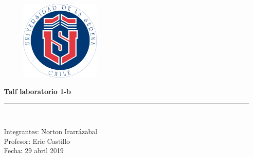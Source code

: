 \documentclass[a4paper,openright,14pt]{report}
\begin{document}
\begin{titlepage}

\begin{center}
\vspace*{-1in}
\begin{figure}[htb]
\begin{center}
\includegraphics[width=4cm]{logo}
\end{center}
\end{figure}

\begin{large}

\end{large}
\vspace*{0.2in}
\begin{Large}
\textbf{Talf laboratorio 1-b} \\
\end{Large}


\vspace*{0.3in}
\rule{80mm}{0.1mm}\\
\vspace*{0.1in}
\begin{large}
Integrantes: Norton Irarr\'azabal \\
Profesor: Eric Castillo \\
Fecha: 29 abril 2019
\end{large}
\end{center}

\end{titlepage}

\newpage
\end{document}
